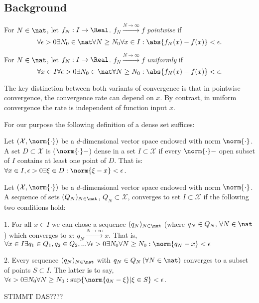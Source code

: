 \subsection{Background}

\begin{defn}
For $N \in \nat$, let $f_N : I \to \Real$. $f_N \stackrel{N \to \infty}{\longrightarrow} f$ \textit{pointwise} if
\[\forall \epsilon >0 \exists N_0 \in \nat \forall N\geq N_0\forall x\in I: \abs{f_N(x) - f(x)} < \epsilon. \] 
 
\end{defn}

\begin{defn}
For $N \in \nat$, let $f_N : I \to \Real$. $f_N \stackrel{N \to \infty}{\longrightarrow} f$ \emph{uniformly} if
\[ \forall x \in I \forall \epsilon >0  \exists N_0 \in \nat \forall N\geq N_0: \abs{f_N(x) - f(x)} < \epsilon. \] 
\end{defn}

The key distinction between both variants of convergence is that in pointwise convergence, the convergence rate can depend on $x$. By contrast, in uniform convergence the rate is independent of function input $x$.


For our purpose the following definition of a dense set suffices:
\begin{defn}[Dense] Let $(\mathcal X,\norm{\cdot})$ be a $d$-dimensional vector space endowed with norm $\norm{\cdot}$.  
A set $D \subset \mathcal X$ is ($\norm{\cdot}-$) dense in a set $I \subset \mathcal X$ if every  $\norm{\cdot}-$ open subset of $I$ contains at least one point of $D$. That is:
$\forall x \in I, \epsilon > 0 \exists \xi \in D: \norm{\xi - x} < \epsilon$.     
\end{defn}


\begin{defn}
Let $(\mathcal X,\norm{\cdot})$ be a $d$-dimensional vector space endowed with norm $\norm{\cdot}$.  
A sequence of sets $(Q_N)_{N \in \nat}$, $Q_N \subset \mathcal X$, converges to set $I \subset \mathcal X$ if the following two conditions hold:

1. For all $ x \in I$ we can chose a sequence $(q_N)_{N \in \nat}$ (where $q_N \in Q_N, \,\forall N \in \nat$) which converges to $x$: $q_N \stackrel{N \to \infty}{\longrightarrow} x$. That is, $\forall x \in I \exists q_1 \in Q_1, q_2 \in Q_2,... \forall \epsilon > 0 \exists N_0 \forall N \geq N_0:  \norm{q_N - x}  < \epsilon$


2. Every sequence $(q_N)_{N \in \nat}$ with $q_N \in Q_N \, (\forall N \in \nat)$ converges to a subset of points $S \subset I$. The latter is to say, $\forall \epsilon > 0 \exists N_0 \forall N \geq N_0: \sup\{ \norm{q_N - \xi} | \xi \in S\} < \epsilon$.

STIMMT DAS????
\end{defn}


